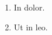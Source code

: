 \documentclass{article}
\begin{document}

\begin{enumerate}
\item In dolor.
\item Ut in leo.
\end{enumerate}

\end{document}
